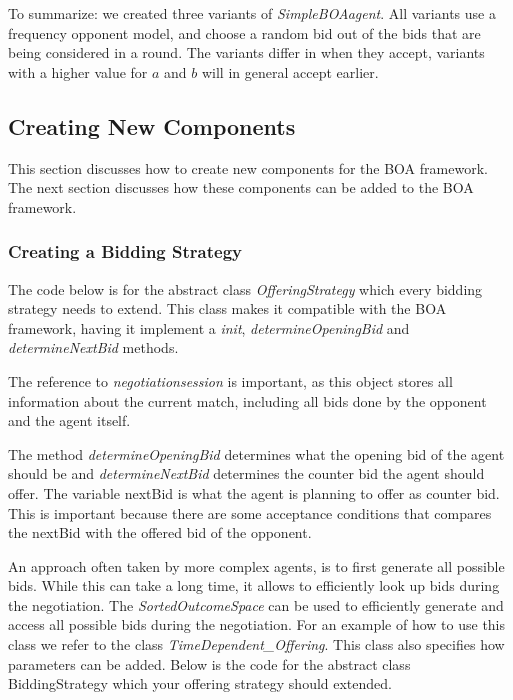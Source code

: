 \documentclass[]{article}
\begin{document}
To summarize: we created three variants of \textit{SimpleBOAagent}. All variants use a frequency opponent model, and choose a random bid out of the bids that are being considered in a round. The variants differ in when they accept, variants with a higher value for $a$ and $b$ will in general accept earlier.

\subsection{Creating New Components}
This section discusses how to create new components for the BOA framework. The next section discusses how these components can be added to the BOA framework.

\subsubsection{Creating a Bidding Strategy}
The code below is for the abstract class \textit{OfferingStrategy} which every bidding strategy needs to extend.  This class makes it compatible with the BOA framework, having it implement a \textit{init}, \textit{determineOpeningBid} and \textit{determineNextBid} methods.

The reference to \textit{negotiationsession} is important, as this object stores all information about the current match, including all bids done by the opponent and the agent itself.

The method \textit{determineOpeningBid} determines what the opening bid of the agent should be and \textit{determineNextBid} determines the counter bid the agent should offer. The variable nextBid is what the agent is planning to offer as counter bid.  This is important because there are some acceptance conditions that compares the nextBid with the offered bid of the opponent.

An approach often taken by more complex agents, is to first generate all possible bids. While this can take a long time, it allows to efficiently look up bids during the negotiation. The \textit{SortedOutcomeSpace} can be used to efficiently generate and access all possible bids during the negotiation. For an example of how to use this class we refer to the class \textit{TimeDependent\_Offering}. This class also specifies how parameters can be added.
Below is the code for the abstract class BiddingStrategy which your offering strategy should extended.
\end{document}

